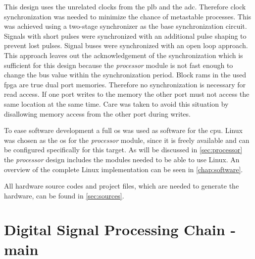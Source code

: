 \documentclass[12pt,a4paper,parskip=full,abstract=true,BCOR=12mm,twoside,open=right]{scrreprt}
\def\device#1{\mbox{\textit{#1}}}
\begin{document}
This design uses the unrelated clocks from the \gls{plb} and the \gls{adc}.
Therefore clock synchronization was needed to minimize the chance of metastable
processes. This was achieved using a two-stage synchronizer as the base
synchronization circuit. Signals with short pulses were synchronized with an
additional pulse shaping to prevent lost pulses. Signal buses were synchronized
with an open loop approach. This approach leaves out the acknowledgement of the
synchronization which is sufficient for this design because the
\device{processor} module is not fast enough to change the bus value within the
synchronization period. Block \glspl{ram} in the used \gls{fpga} are true dual port
memories. Therefore no synchronization is necessary for read access. If one port
writes to the memory the other port must not access the same location at the same
time\cite{virtex5}. Care was taken to avoid this situation by disallowing
memory access from the other port during writes.

To ease software development a full \gls{os} was used as software for the
\gls{cpu}. Linux was chosen as the \gls{os} for the \device{processor} module, since
it is freely available and can be configured specifically for this target. As will
be discussed in \cref{sec:processor} the \device{processor} design includes the modules
needed to be able to use Linux. An overview of the complete Linux implementation
can be seen in \cref{chap:software}.

All hardware source codes and project files, which are needed to generate the hardware, can
be found in \cref{sec:sources}.


\section[Digital Signal Processing Chain]{Digital Signal Processing Chain - main}
\label{sec:digital_processing}
\end{document}
